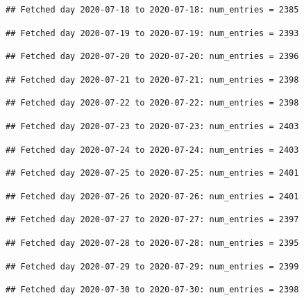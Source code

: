 \documentclass[]{article}
\begin{document}
\begin{verbatim}
## Fetched day 2020-07-18 to 2020-07-18: num_entries = 2385
\end{verbatim}

\begin{verbatim}
## Fetched day 2020-07-19 to 2020-07-19: num_entries = 2393
\end{verbatim}

\begin{verbatim}
## Fetched day 2020-07-20 to 2020-07-20: num_entries = 2396
\end{verbatim}

\begin{verbatim}
## Fetched day 2020-07-21 to 2020-07-21: num_entries = 2398
\end{verbatim}

\begin{verbatim}
## Fetched day 2020-07-22 to 2020-07-22: num_entries = 2398
\end{verbatim}

\begin{verbatim}
## Fetched day 2020-07-23 to 2020-07-23: num_entries = 2403
\end{verbatim}

\begin{verbatim}
## Fetched day 2020-07-24 to 2020-07-24: num_entries = 2403
\end{verbatim}

\begin{verbatim}
## Fetched day 2020-07-25 to 2020-07-25: num_entries = 2401
\end{verbatim}

\begin{verbatim}
## Fetched day 2020-07-26 to 2020-07-26: num_entries = 2401
\end{verbatim}

\begin{verbatim}
## Fetched day 2020-07-27 to 2020-07-27: num_entries = 2397
\end{verbatim}

\begin{verbatim}
## Fetched day 2020-07-28 to 2020-07-28: num_entries = 2395
\end{verbatim}

\begin{verbatim}
## Fetched day 2020-07-29 to 2020-07-29: num_entries = 2399
\end{verbatim}

\begin{verbatim}
## Fetched day 2020-07-30 to 2020-07-30: num_entries = 2398
\end{verbatim}
\end{document}
